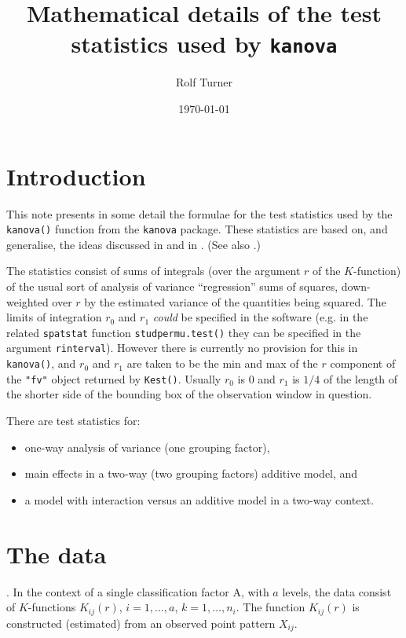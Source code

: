 \documentclass[12pt]{article}
\begin{document}
\title{Mathematical details of the test statistics used by \texttt{kanova}}
\author{Rolf Turner}
\date{\today}
\maketitle

\section{Introduction}
\label{sec:intro}
This note presents in some detail the formulae for the test
statistics used by the \texttt{kanova()} function from the
\texttt{kanova} package.  These statistics are based on, and
generalise, the ideas discussed in \cite{DiggleEtAl2000} and in
\cite{Hahn2012}.  (See also \cite{DiggleEtAl1991}.)

The statistics consist of sums of integrals (over the argument $r$
of the $K$-function) of the usual sort of analysis of variance
``regression'' sums of squares, down-weighted over $r$ by the
estimated variance of the quantities being squared.  The limits
of integration $r_0$ and $r_1$ \emph{could} be specified in
the software (e.g. in the related \texttt{spatstat} function
\texttt{studpermu.test()} they can be specified in the argument
\texttt{rinterval}).  However there is currently no provision
for this in \texttt{kanova()}, and $r_0$ and $r_1$ are taken
to be the min and max of the $r$ component of the \texttt{"fv"}
object returned by \texttt{Kest()}.   Usually $r_0$ is 0 and $r_1$
is $1/4$ of the length of the shorter side of the bounding box of
the observation window in question.

There are test statistics for:
\begin{itemize}
\item one-way analysis of variance (one grouping factor),
\item main effects in a two-way (two grouping factors) additive model, and
\item a model with interaction versus an additive model in a two-way
context.
\end{itemize}

\section{The data}.
In the context of a single classification factor A, with $a$ levels,
the data consist of $K$-functions $K_{ij}(r)$, $i = 1, \ldots,
a$, $k = 1, \ldots, n_i$.  The function $K_{ij}(r)$ is constructed
(estimated) from an observed point pattern $X_{ij}$.
\end{document}

